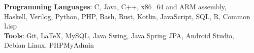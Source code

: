 \textbf{Programming Languages}: C, Java, C++, x86\_64 and ARM assembly, Haskell, Verilog, Python, PHP, Bash, Rust, Kotlin, JavaScript, SQL, R, Common Lisp\\
\textbf{Tools}: Git, \LaTeX{}, MySQL, Java Swing, Java Spring JPA, Android Studio, Debian Linux, PHPMyAdmin